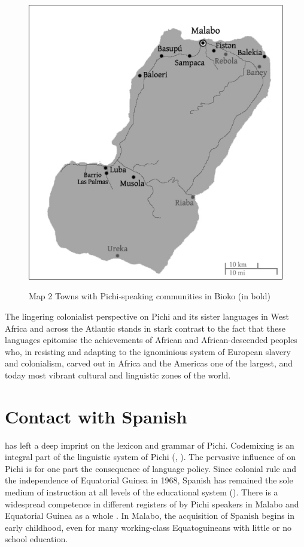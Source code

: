 \begin{figure}
	\caption{Map 2 Towns with Pichi-speaking communities in Bioko (in bold)}
	\includegraphics[width=.5\textwidth]{figures/yakpomod-img2.png}
	\label{map:1:1.2}
\end{figure}

The lingering colonialist perspective on Pichi and its sister languages in West Africa and across the Atlantic stands in stark contrast to the fact that these languages epitomise the achievements of African and African-descended peoples who, in resisting and adapting to the ignominious system of European slavery and colonialism, carved out in Africa and the Americas one of the largest, and today most vibrant cultural and linguistic zones of the world.

\section{Contact with Spanish}\label{sec:1.2}

 has left a deep imprint on the lexicon and grammar of Pichi. Codemixing is an integral part of the linguistic system of Pichi (\citealt{Yakpo2009complexity}, \citealt{Yakpo2018}). The pervasive influence of  on Pichi is for one part the consequence of language policy. Since colonial rule and the independence of Equatorial Guinea in 1968, Spanish has remained the sole medium of instruction at all levels of the educational system (\citealt[35–36]{Lipski1992}). There is a widespread competence in different registers of  by Pichi speakers in Malabo and Equatorial Guinea as a whole \citep{Lipski1985,García2016}. In Malabo, the acquisition of Spanish begins in early childhood, even for many working-class Equatoguineans with little or no school education. 

